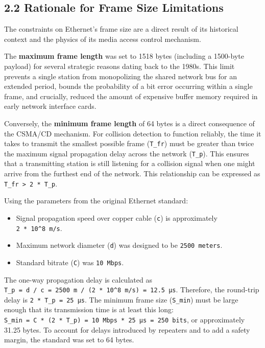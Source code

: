 \documentclass[a4paper, 12pt]{book} %
\begin{document}
\subsection{2.2 Rationale for Frame Size
Limitations}\label{rationale-for-frame-size-limitations}

The constraints on Ethernet's frame size are a direct result of its
historical context and the physics of its media access control
mechanism.

The \textbf{maximum frame length} was set to 1518 bytes (including a
1500-byte payload) for several strategic reasons dating back to the
1980s. This limit prevents a single station from monopolizing the shared
network bus for an extended period, bounds the probability of a bit
error occurring within a single frame, and crucially, reduced the amount
of expensive buffer memory required in early network interface cards.

Conversely, the \textbf{minimum frame length} of 64 bytes is a direct
consequence of the CSMA/CD mechanism. For collision detection to
function reliably, the time it takes to transmit the smallest possible
frame (\texttt{T\_fr}) must be greater than twice the maximum signal
propagation delay across the network (\texttt{T\_p}). This ensures that
a transmitting station is still listening for a collision signal when
one might arrive from the furthest end of the network. This relationship
can be expressed as \texttt{T\_fr\ \textgreater{}\ 2\ *\ T\_p}.

Using the parameters from the original Ethernet standard:

\begin{itemize}
\tightlist
\item
  Signal propagation speed over copper cable (\texttt{c}) is
  approximately \texttt{2\ *\ 10\^{}8\ m/s}.
\item
  Maximum network diameter (\texttt{d}) was designed to be
  \texttt{2500\ meters}.
\item
  Standard bitrate (\texttt{C}) was \texttt{10\ Mbps}.
\end{itemize}

The one-way propagation delay is calculated as
\texttt{T\_p\ =\ d\ /\ c\ =\ 2500\ m\ /\ (2\ *\ 10\^{}8\ m/s)\ =\ 12.5\ µs}.
Therefore, the round-trip delay is \texttt{2\ *\ T\_p\ =\ 25\ µs}. The
minimum frame size (\texttt{S\_min}) must be large enough that its
transmission time is at least this long:
\texttt{S\_min\ =\ C\ *\ (2\ *\ T\_p)\ =\ 10\ Mbps\ *\ 25\ µs\ =\ 250\ bits},
or approximately 31.25 bytes. To account for delays introduced by
repeaters and to add a safety margin, the standard was set to 64 bytes.
\end{document}
